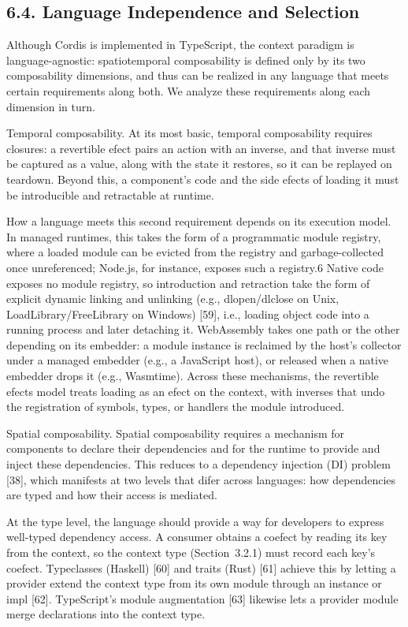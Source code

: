 \documentclass[
  10
]{article}
\begin{document}
\subsection{6.4. Language Independence and
Selection}\label{language-independence-and-selection}

Although Cordis is implemented in TypeScript, the context paradigm is
language-agnostic: spatiotemporal composability is defined only by its
two composability dimensions, and thus can be realized in any language
that meets certain requirements along both. We analyze these
requirements along each dimension in turn.

Temporal composability. At its most basic, temporal composability
requires closures: a revertible efect pairs an action with an inverse,
and that inverse must be captured as a value, along with the state it
restores, so it can be replayed on teardown. Beyond this, a component's
code and the side efects of loading it must be introducible and
retractable at runtime.

How a language meets this second requirement depends on its execution
model. In managed runtimes, this takes the form of a programmatic module
registry, where a loaded module can be evicted from the registry and
garbage-collected once unreferenced; Node.js, for instance, exposes such
a registry.6 Native code exposes no module registry, so introduction and
retraction take the form of explicit dynamic linking and unlinking
(e.g., dlopen/dlclose on Unix, LoadLibrary/FreeLibrary on Windows)
{[}59{]}, i.e., loading object code into a running process and later
detaching it. WebAssembly takes one path or the other depending on its
embedder: a module instance is reclaimed by the host's collector under a
managed embedder (e.g., a JavaScript host), or released when a native
embedder drops it (e.g., Wasmtime). Across these mechanisms, the
revertible efects model treats loading as an efect on the context, with
inverses that undo the registration of symbols, types, or handlers the
module introduced.

Spatial composability. Spatial composability requires a mechanism for
components to declare their dependencies and for the runtime to provide
and inject these dependencies. This reduces to a dependency injection
(DI) problem {[}38{]}, which manifests at two levels that difer across
languages: how dependencies are typed and how their access is mediated.

At the type level, the language should provide a way for developers to
express well-typed dependency access. A consumer obtains a coefect by
reading its key from the context, so the context type (Section~3.2.1)
must record each key's coefect. Typeclasses (Haskell) {[}60{]} and
traits (Rust) {[}61{]} achieve this by letting a provider extend the
context type from its own module through an instance or impl {[}62{]}.
TypeScript's module augmentation {[}63{]} likewise lets a provider
module merge declarations into the context type.
\end{document}
